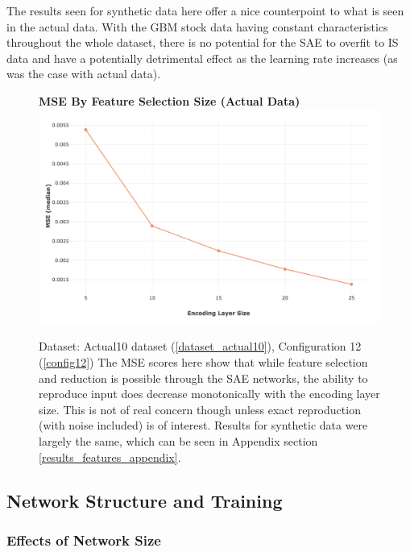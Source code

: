 \documentclass[a4paper,11pt,oneside]{article}
\theoremstyle{plain}
\theoremstyle{definition}
\begin{document}
	The results seen for synthetic data here offer a nice counterpoint to what is seen in the actual data. With the GBM stock data having constant characteristics throughout the whole dataset, there is no potential for the SAE to overfit to IS data and have a potentially detrimental effect as the learning rate increases (as was the case with actual data).
	
	
	\begin{figure}[H]
		\centering 
		\textbf{MSE By Feature Selection Size (Actual Data)}
		\includegraphics[scale=0.4]{images/results/feature_selection/actual_sae_mse.png}
		\caption[MSE By Feature Selection Size (Actual Data)]{Dataset: Actual10 dataset (\ref{dataset_actual10}), Configuration 12 (\ref{config12})
			\newline The MSE scores here show that while feature selection and reduction is possible through the SAE networks, the ability to reproduce input does decrease monotonically with the encoding layer size. This is not of real concern though unless exact reproduction (with noise included) is of interest. Results for synthetic data were largely the same, which can be seen in Appendix section \ref{results_features_appendix}.}
		\label{figure-actual_sae_mse}
	\end{figure}
	
	\newpage
	
	\subsection{Network Structure and Training}\label{results_network}
	
	\subsubsection{Effects of Network Size}
	
\end{document}
